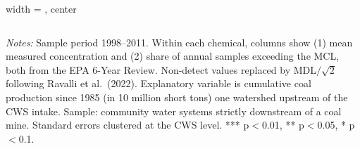 \begin{table}[htbp]
\begin{adjustbox}{width = \textwidth, center}
\begin{tabular}{lcc}
         \bottomrule
         
      \end{tabular}
      
      
      
   \end{adjustbox}
      {\tiny\linespread{1}\selectfont \par \raggedright 
   \textit{Notes:} Sample period 1998--2011. Within each chemical, columns show (1) mean measured concentration and (2) share of annual samples exceeding the MCL, both from the EPA 6-Year Review. Non-detect values replaced by MDL$/\sqrt{2}$ following Ravalli et al.~(2022). Explanatory variable is cumulative coal production since 1985 (in 10 million short tons) one watershed upstream of the CWS intake. Sample: community water systems strictly downstream of a coal mine. Standard errors clustered at the CWS level. *** p$<$0.01, ** p$<$0.05, * p$<$0.1.}
   
\end{table}


